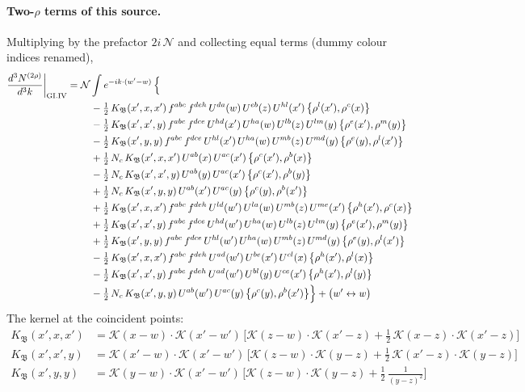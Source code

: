 \documentclass[10pt]{article}
\numberwithin{equation}{section}
\newcommand{\KK}{\mathcal K}
\newcommand{\NN}{\mathcal N}
\begin{document}
\paragraph{Two-$\rho$ terms of this source.} Multiplying by the prefactor $2i\,\NN$ and collecting equal terms (dummy colour indices renamed),
\begin{align}
\frac{d^3N^{(2\rho)}}{d^3k}\bigg|_{\rm GI.IV}={}&\NN\int e^{-ik\cdot(w'-w)}\,\Big\{\notag\\
&\quad -\tfrac12\,K_{\mathfrak B}(x',x,x')\,f^{abc}\,f^{deh}\,U^{da}(w)\,U^{eb}(z)\,U^{hl}(x')\,\big\{\rho^{l}(x'),\rho^{c}(x)\big\}\notag\\
&\quad -\tfrac12\,K_{\mathfrak B}(x',x',y)\,f^{abc}\,f^{dce}\,U^{hd}(x')\,U^{ha}(w)\,U^{lb}(z)\,U^{lm}(y)\,\big\{\rho^{e}(x'),\rho^{m}(y)\big\}\notag\\
&\quad -\tfrac12\,K_{\mathfrak B}(x',y,y)\,f^{abc}\,f^{dce}\,U^{hl}(x')\,U^{ha}(w)\,U^{mb}(z)\,U^{md}(y)\,\big\{\rho^{e}(y),\rho^{l}(x')\big\}\notag\\
&\quad +\tfrac12\,N_{c}\,K_{\mathfrak B}(x',x,x')\,U^{ab}(x)\,U^{ac}(x')\,\big\{\rho^{c}(x'),\rho^{b}(x)\big\}\notag\\
&\quad -\tfrac12\,N_{c}\,K_{\mathfrak B}(x',x',y)\,U^{ab}(y)\,U^{ac}(x')\,\big\{\rho^{c}(x'),\rho^{b}(y)\big\}\notag\\
&\quad +\tfrac12\,N_{c}\,K_{\mathfrak B}(x',y,y)\,U^{ab}(x')\,U^{ac}(y)\,\big\{\rho^{c}(y),\rho^{b}(x')\big\}\notag\\
&\quad +\tfrac12\,K_{\mathfrak B}(x',x,x')\,f^{abc}\,f^{deh}\,U^{ld}(w')\,U^{la}(w)\,U^{mb}(z)\,U^{me}(x')\,\big\{\rho^{h}(x'),\rho^{c}(x)\big\}\notag\\
&\quad +\tfrac12\,K_{\mathfrak B}(x',x',y)\,f^{abc}\,f^{dce}\,U^{hd}(w')\,U^{ha}(w)\,U^{lb}(z)\,U^{lm}(y)\,\big\{\rho^{e}(x'),\rho^{m}(y)\big\}\notag\\
&\quad +\tfrac12\,K_{\mathfrak B}(x',y,y)\,f^{abc}\,f^{dce}\,U^{hl}(w')\,U^{ha}(w)\,U^{mb}(z)\,U^{md}(y)\,\big\{\rho^{e}(y),\rho^{l}(x')\big\}\notag\\
&\quad -\tfrac12\,K_{\mathfrak B}(x',x,x')\,f^{abc}\,f^{deh}\,U^{ad}(w')\,U^{be}(x')\,U^{cl}(x)\,\big\{\rho^{h}(x'),\rho^{l}(x)\big\}\notag\\
&\quad -\tfrac12\,K_{\mathfrak B}(x',x',y)\,f^{abc}\,f^{deh}\,U^{ad}(w')\,U^{bl}(y)\,U^{ce}(x')\,\big\{\rho^{h}(x'),\rho^{l}(y)\big\}\notag\\
&\quad -\tfrac12\,N_{c}\,K_{\mathfrak B}(x',y,y)\,U^{ab}(w')\,U^{ac}(y)\,\big\{\rho^{c}(y),\rho^{b}(x')\big\}\Big\}+\big(w'\leftrightarrow w\big)\label{eq:res-GI.IV}
\end{align}
The kernel at the coincident points:
\begin{align*}
K_{\mathfrak B}(x',x,x')&=\KK(x-w)\cdot\KK(x'-w')\,\Big[\KK(z-w)\cdot\KK(x'-z)+\tfrac12\,\KK(x-z)\cdot\KK(x'-z)\Big]\\K_{\mathfrak B}(x',x',y)&=\KK(x'-w)\cdot\KK(x'-w')\,\Big[\KK(z-w)\cdot\KK(y-z)+\tfrac12\,\KK(x'-z)\cdot\KK(y-z)\Big]\\K_{\mathfrak B}(x',y,y)&=\KK(y-w)\cdot\KK(x'-w')\,\Big[\KK(z-w)\cdot\KK(y-z)+\tfrac12\,\frac{1}{(y-z)^2}\Big]
\end{align*}
\end{document}

